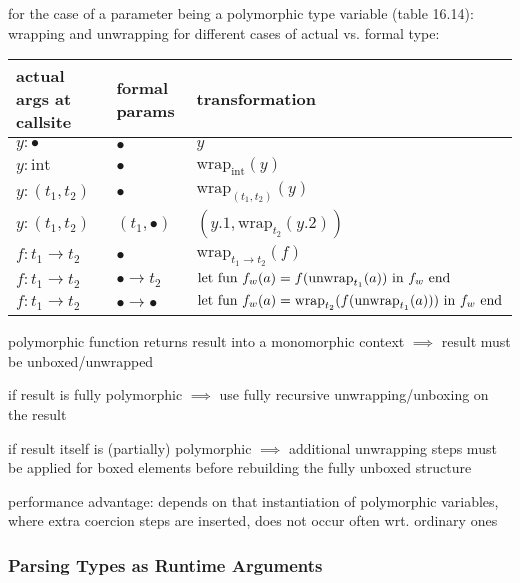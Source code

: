 \documentclass[8pt]{extarticle}
\begin{document}
\begin{multicols*}{2}
  for the case of a parameter being a polymorphic type variable (table 16.14): wrapping and unwrapping for different cases of actual vs. formal type:
  
  \begin{center}
    \begin{tabular}{ | p{15mm} | p{10mm} | p{55mm} |}
      \hline
      actual args at callsite & formal params & transformation \\
      \hline
      $y: \bullet$ & $\bullet$ & $y$\\
      $y: \text{int}$ & $\bullet$ & $\text{wrap}_{\text{int}}(y)$\\
      $y: (t_1, t_2)$ & $\bullet$ & $\text{wrap}_{(t_1,t_2)}(y)$\\
      $y: (t_1, t_2)$ & $(t_1, \bullet)$ & $(y.1, \text{wrap}_{t_2}(y.2))$\\
      $f: t_1 \rightarrow t_2$ & $\bullet$ & $\text{wrap}_{t_1 \rightarrow t_2}(f)$\\
      $f: t_1 \rightarrow t_2$ & $\bullet \rightarrow t_2$ & $\text{let fun }f_w(a) = f(\text{unwrap}_{t_1}(a)) \newline \text{ in }f_w \text{ end}$\\
      $f: t_1 \rightarrow t_2$ & $\bullet \rightarrow \bullet$ & $\text{let fun }f_w(a) = \text{wrap}_{t_2}(f(\text{unwrap}_{t_1}(a))) \newline \text{ in }f_w \text{ end}$\\
      \hline 
    \end{tabular}
  \end{center}

  polymorphic function returns result into a monomorphic context $\implies$ result must be unboxed/unwrapped

  if result is fully polymorphic $\implies$ use fully recursive unwrapping/unboxing on the result

  if result itself is (partially) polymorphic $\implies$ additional unwrapping steps must be applied for boxed elements before rebuilding the fully unboxed structure

  performance advantage: depends on that instantiation of polymorphic variables, where extra coercion steps are inserted, does not occur often wrt. ordinary ones

  \subsubsection{Parsing Types as Runtime Arguments}


\end{multicols*}
\end{document}
